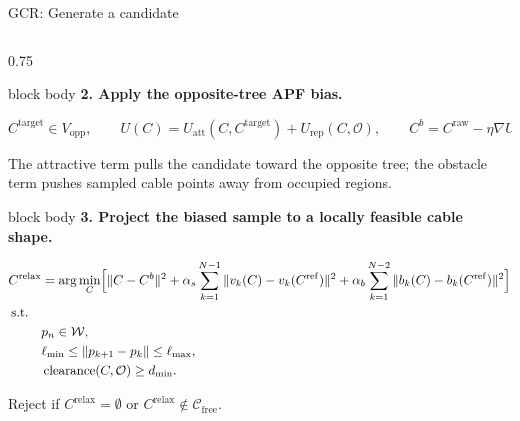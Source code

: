 \documentclass[aspectratio=169,10pt]{beamer}
\newcommand{\Cfree}{\mathcal C_{\mathrm{free}}}
\begin{document}
\begin{frame}[t]{GCR: Generate a candidate}
\begin{columns}[T,onlytextwidth]
\begin{column}{0.75\textwidth}
      \vspace{0.035cm}
      \begin{beamercolorbox}[wd=\textwidth,sep=0.07cm]{block body}
        \fontsize{6.6}{7.1}\selectfont
        \textbf{2. Apply the opposite-tree APF bias.}\par\vspace{0.4ex}
        \centering
        \(
          C^{\mathrm{target}}\in V_{\mathrm{opp}},\qquad
          U(C)=U_{\mathrm{att}}(C,C^{\mathrm{target}})+U_{\mathrm{rep}}(C,\mathcal O),
          \qquad
          C^b=C^{\mathrm{raw}}-\eta\nabla U(C^{\mathrm{raw}}).
        \)
        \par\raggedright\vspace{0.2ex}
        The attractive term pulls the candidate toward the opposite tree; the
        obstacle term pushes sampled cable points away from occupied regions.
      \end{beamercolorbox}

      \vspace{0.035cm}
      \begin{beamercolorbox}[wd=\textwidth,sep=0.07cm]{block body}
        \fontsize{6.6}{7.1}\selectfont
        \textbf{3. Project the biased sample to a locally feasible cable shape.}\par\vspace{0.2ex}
        \centering
        \(
          \begin{aligned}
            C^{\mathrm{relax}}
              &=\arg\min_C\Bigl[\|C-C^b\|^2
                +\alpha_s\sum_{k=1}^{N-1}\|v_k(C)-v_k(C^{\mathrm{ref}})\|^2
                +\alpha_b\sum_{k=1}^{N-2}\|b_k(C)-b_k(C^{\mathrm{ref}})\|^2\Bigr]\\[-0.1ex]
            \text{s.t.}\quad \\
              &p_n\in\mathcal W,\quad \\
              & \ell_{\min}\leq\|p_{k+1}-p_k\|\leq\ell_{\max},\quad \\
              & \operatorname{clearance}(C,\mathcal O)\geq d_{\min}.
          \end{aligned}
        \)
        \par\raggedright\vspace{0.2ex}
        Reject if \(C^{\mathrm{relax}}=\emptyset\) or \(C^{\mathrm{relax}}\notin\Cfree\).
      \end{beamercolorbox}

    \end{column}
  \end{columns}
\end{frame}
\end{document}
